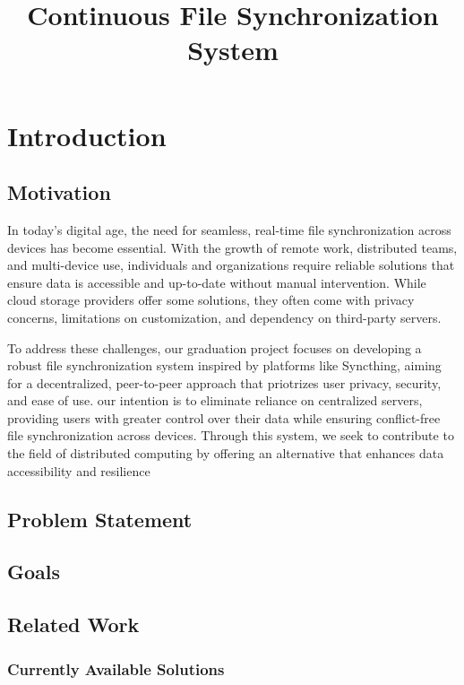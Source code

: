 \documentclass{book}
\title{
Continuous File Synchronization System 
}
\begin{document}
	
	\maketitle
	
	\chapter{Introduction}
		\section{Motivation}
      In today's digital age, the need for seamless, real-time file synchronization across devices has become essential. With the growth of remote work, distributed teams, and multi-device use, individuals and organizations require reliable solutions that ensure data is accessible and up-to-date without manual intervention. While cloud storage providers offer some solutions, they often come with privacy concerns, limitations on customization, and dependency on third-party servers.

      To address these challenges, our graduation project focuses on developing a robust file synchronization system inspired by platforms like Syncthing, aiming for a decentralized, peer-to-peer approach that priotrizes user privacy, security, and ease of use. our intention is to eliminate reliance on centralized servers, providing users with greater control over their data while ensuring conflict-free file synchronization across devices. Through this system, we seek to contribute to the field of distributed computing by offering an alternative that enhances data accessibility and resilience

		\section{Problem Statement}
		
		\section{Goals}
		
		\section{Related Work}
			\subsection{Currently Available Solutions}
			
\end{document}

